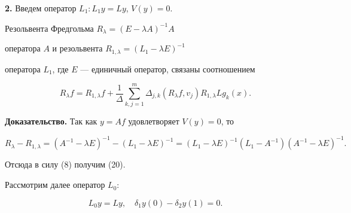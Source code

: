 {\bf 2.} Введем оператор $L_1: L_1y=Ly$, $V(y)=0$.





\begin{thm}


Резольвента Фредгольма $R_\lambda=(E-\lambda A)^{-1}A$


оператора $A$ и резольвента $R_{1,\lambda}=(L_1-\lambda E)^{-1}$


оператора $L_1$, где $E$ --- единичный оператор, связаны соотношением


\begin{equation}


R_{\lambda}f= R_{1,\lambda}f+\frac1\Delta\sum\limits_{k,j=1}^{m}


\Delta_{j,k}( R_{\lambda}f,v_j) R_{1,\lambda}Lg_k(x).


\end{equation}


\end{thm}





{\bf Доказательство.} Так как $y=Af$ удовлетворяет $V(y)=0$, то


$$


R_{\lambda} -R_{1,\lambda}=(A^{-1}-\lambda E)^{-1}-(L_1-\lambda E)^{-1}=


(L_1-\lambda E)^{-1}(L_1-A^{-1})(A^{-1}-\lambda E)^{-1}.


$$


Отсюда в силу (8) получим (20).





Рассмотрим далее оператор $L_0$:


$$


L_0y=Ly,\quad \delta_1y(0)-\delta_2y(1)=0.


$$





